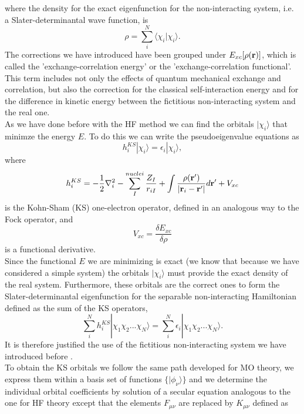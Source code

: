 where the density for the exact eigenfunction for the non-interacting system, i.e. a Slater-determinantal wave function, is
\begin{equation}
    \rho = \sum_i^N \langle\chi_i|\chi_i\rangle.
\end{equation}
The corrections we have introduced have been grouped under $E_{xc}[\rho({\bf r})]$, which is called the 'exchange-correlation energy' or the 'exchange-correlation functional'. This term includes not only the effects of quantum mechanical exchange and correlation, but also the correction for the classical self-interaction energy and for the difference in kinetic energy between the fictitious non-interacting system and the real one. \\
As we have done before with the HF method we can find the orbitals $|\chi_i\rangle$ that minimze the energy $E$. To do this we can write the pseudoeigenvalue equations as
\begin{equation}
    h^{KS}_i |\chi_i\rangle = \epsilon_i |\chi_i\rangle,
\end{equation}
where
\begin{equation}
    h^{KS}_i = -\frac12\nabla^2_i -\sum_I^{nuclei}\frac{Z_I}{r_{iI}} + \int \frac{\rho({\bf r}')}{|{\bf r}_i - {\bf r}'|} d{\bf r}' + V_{xc}
\end{equation}
is the Kohn-Sham (KS) one-electron operator, defined in an analogous way to the Fock operator, and
\begin{equation}
    V_{xc} = \frac{\delta E_{xc}}{\delta \rho}
\end{equation}
is a functional derivative. \\
Since the functional $E$ we are minimizing is exact (we know that because we have considered a simple system) the orbitals $|\chi_i\rangle$ must provide the exact density of the real system. Furthermore, these orbitals are the correct ones to form the Slater-determinantal eigenfunction for the separable non-interacting Hamiltonian defined as the sum of the KS operators,
\begin{equation}
    \sum_i^N h^{KS}_i |\chi_1 \chi_2 ... \chi_N\rangle = \sum_i^N \epsilon_i |\chi_1 \chi_2 ... \chi_N\rangle.
\end{equation}
It is therefore justified the use of the fictitious non-interacting system we have introduced before \cite{Cramer2004Sep}. \\
To obtain the KS orbitals we follow the same path developed for MO theory, we express them within a basis set of functions $\{ |\phi_{\nu}\rangle \}$ and we determine the individual orbital coefficients by solution of a secular equation analogous to the one for HF theory except that the elements $F_{\mu \nu}$ are replaced by $K_{\mu \nu}$ defined as
